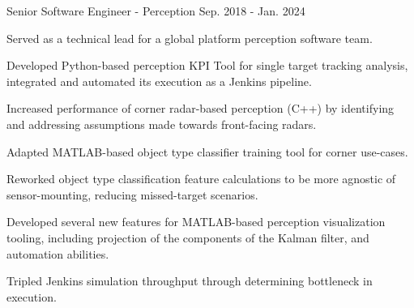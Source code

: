 \begin{cventries}
  \cventry
    {Senior Software Engineer - Perception} %
    {} %
    {} %
    {Sep. 2018 - Jan. 2024} %
    {
      \begin{cvitems} %
        \item {Served as a technical lead for a global platform perception software team.}
        \item {Developed Python-based perception KPI Tool for single target tracking analysis, integrated and automated its execution as a Jenkins pipeline.}
        \item {Increased performance of corner radar-based perception (C++) by identifying and addressing assumptions made towards front-facing radars.}
        \item {Adapted MATLAB-based object type classifier training tool for corner use-cases.}
        \item {Reworked object type classification feature calculations to be more agnostic of sensor-mounting, reducing missed-target scenarios.}
        \item {Developed several new features for MATLAB-based perception visualization tooling, including projection of the components of the Kalman filter, and automation abilities.}
        \item {Tripled Jenkins simulation throughput through determining bottleneck in execution.}
      \end{cvitems}
    }


\end{cventries}

